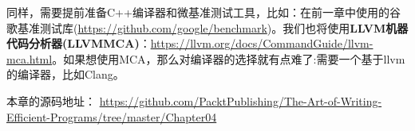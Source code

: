 同样，需要提前准备C++编译器和微基准测试工具，比如：在前一章中使用的谷歌基准测试库(\url{https://github.com/google/benchmark})。我们也将使用\textbf{LLVM机器代码分析器(LLVMMCA)}：\url{https://llvm.org/docs/CommandGuide/llvm-mca.html}。如果想使用MCA，那么对编译器的选择就有点难了:需要一个基于llvm的编译器，比如Clang。

本章的源码地址： \url{https://github.com/PacktPublishing/The-Art-of-Writing-Efficient-Programs/tree/master/Chapter04}